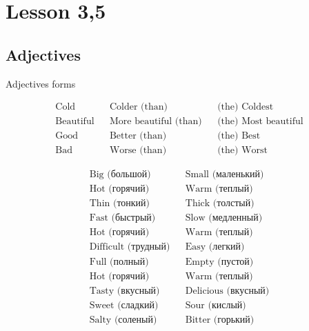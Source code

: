 \documentclass{tstextbook}
\begin{document}
	
	
	\chapter{Lesson 3,5}
	
	\section{Adjectives}

	\begin{theorem} Adjectives forms
	\label{th: adj_forms}
	
		\begin{align*}
			\text{Cold} && \text{Colder (than)} && \text{(the) Coldest} \\
			\text{Beautiful} && \text{More beautiful (than)} && \text{(the) Most beautiful} \\
			\text{Good} && \text{Better (than)} && \text{(the) Best} \\
			\text{Bad} && \text{Worse (than)} && \text{(the) Worst}
		\end{align*}
	\end{theorem}

	\begin{example}
	\begin{align*}
		\text{Big (большой)} && \text{Small (маленький)} \\
		\text{Hot (горячий)} && \text{Warm (теплый)} \\
		\text{Thin (тонкий)} && \text{Thick (толстый)} \\
		\text{Fast (быстрый)} && \text{Slow (медленный)} \\
		\text{Hot (горячий)} && \text{Warm (теплый)} \\
		\text{Difficult (трудный)} && \text{Easy (легкий)} \\
		\text{Full (полный)} && \text{Empty (пустой)} \\
		\text{Hot (горячий)} && \text{Warm (теплый)} \\
		\text{Tasty (вкусный)} && \text{Delicious (вкусный)} \\
		\text{Sweet (сладкий)} && \text{Sour (кислый)} \\
		\text{Salty (соленый)} && \text{Bitter (горький)} \\
	\end{align*}
\end{example}
\end{document}
